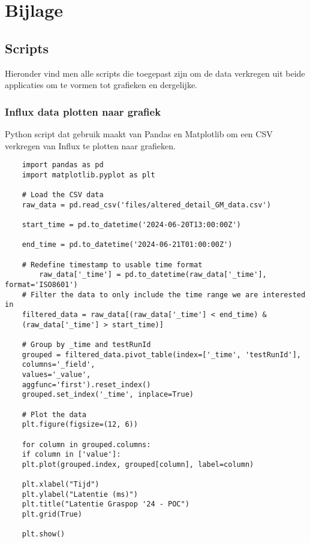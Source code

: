 \chapter{Bijlage}

\section{Scripts}

Hieronder vind men alle scripts die toegepast zijn om de data verkregen uit beide applicaties om te vormen tot grafieken en dergelijke.

\subsection{Influx data plotten naar grafiek}

Python script dat gebruik maakt van Pandas en Matplotlib om een CSV verkregen van Influx te plotten naar grafieken. 

\begin{verbatim}
    import pandas as pd
    import matplotlib.pyplot as plt
    
    # Load the CSV data
    raw_data = pd.read_csv('files/altered_detail_GM_data.csv')
    
    start_time = pd.to_datetime('2024-06-20T13:00:00Z')
    
    end_time = pd.to_datetime('2024-06-21T01:00:00Z')
    
    # Redefine timestamp to usable time format
        raw_data['_time'] = pd.to_datetime(raw_data['_time'], format='ISO8601')
    # Filter the data to only include the time range we are interested in
    filtered_data = raw_data[(raw_data['_time'] < end_time) & 
    (raw_data['_time'] > start_time)]
    
    # Group by _time and testRunId
    grouped = filtered_data.pivot_table(index=['_time', 'testRunId'],
    columns='_field',
    values='_value',
    aggfunc='first').reset_index()
    grouped.set_index('_time', inplace=True)
    
    # Plot the data
    plt.figure(figsize=(12, 6))
    
    for column in grouped.columns:
    if column in ['value']:
    plt.plot(grouped.index, grouped[column], label=column)
    
    plt.xlabel("Tijd")
    plt.ylabel("Latentie (ms)")
    plt.title("Latentie Graspop '24 - POC")
    plt.grid(True)
    
    plt.show()
\end{verbatim}